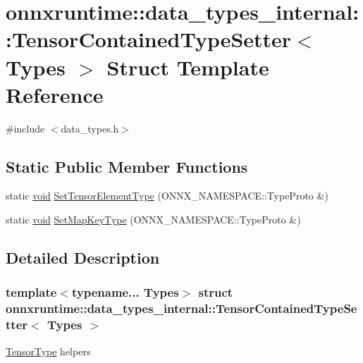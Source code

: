 \hypertarget{structonnxruntime_1_1data__types__internal_1_1TensorContainedTypeSetter}{}\section{onnxruntime\+:\+:data\+\_\+types\+\_\+internal\+:\+:Tensor\+Contained\+Type\+Setter$<$ Types $>$ Struct Template Reference}
\label{structonnxruntime_1_1data__types__internal_1_1TensorContainedTypeSetter}


{\ttfamily \#include $<$data\+\_\+types.\+h$>$}

\subsection*{Static Public Member Functions}
\begin{DoxyCompactItemize}
\item 
static \mbox{\hyperlink{mlasi_8h_a88f941d423cb2a819b70a1358982b1a6}{void}} \mbox{\hyperlink{structonnxruntime_1_1data__types__internal_1_1TensorContainedTypeSetter_a818e2f3d6031c4a8d07350df703066aa}{Set\+Tensor\+Element\+Type}} (O\+N\+N\+X\+\_\+\+N\+A\+M\+E\+S\+P\+A\+C\+E\+::\+Type\+Proto \&)
\item 
static \mbox{\hyperlink{mlasi_8h_a88f941d423cb2a819b70a1358982b1a6}{void}} \mbox{\hyperlink{structonnxruntime_1_1data__types__internal_1_1TensorContainedTypeSetter_a9341fdc0278f2434d010bb8dd358c405}{Set\+Map\+Key\+Type}} (O\+N\+N\+X\+\_\+\+N\+A\+M\+E\+S\+P\+A\+C\+E\+::\+Type\+Proto \&)
\end{DoxyCompactItemize}


\subsection{Detailed Description}
\subsubsection*{template$<$typename... Types$>$\newline
struct onnxruntime\+::data\+\_\+types\+\_\+internal\+::\+Tensor\+Contained\+Type\+Setter$<$ Types $>$}

\mbox{\hyperlink{classonnxruntime_1_1TensorType}{Tensor\+Type}} helpers 

